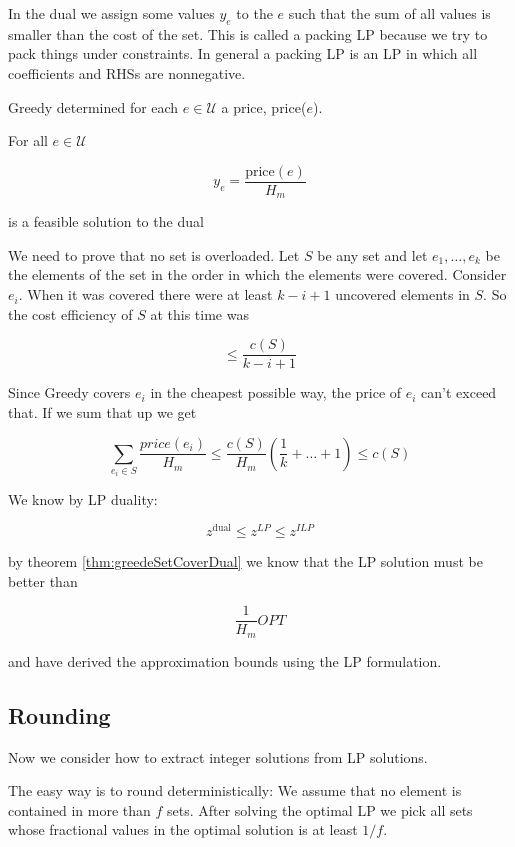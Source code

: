 In the dual we assign some values $y_e$ to the $e$ such that the sum of all values is smaller than the cost of the set. This is called a packing LP because we try to pack things under constraints. In general a packing LP is an LP in which all coefficients and RHSs are nonnegative.

\begin{thm} \label{thm:greedySetCoverDual}Greedy determined for each $e\in \mathcal{U}$ a price, price($e$).

For all $e\in \mathcal{U}$

\[y_e= \frac{\text{price}(e)}{H_m}\]

is a feasible solution to the dual
\end{thm}

\begin{pr} We need to prove that no set is overloaded. Let $S$ be any set and let $e_1,\ldots, e_k$ be the elements of the set in the order in which the elements were covered. Consider $e_i$. When it was covered there were at least $k-i+1$ uncovered elements in $S$. So the cost efficiency of $S$ at this time was 

\[\leq \frac{c(S)}{k-i+1}\]

Since Greedy covers $e_i$ in the cheapest possible way, the price of $e_i$ can't exceed that. If we sum that up we get

\[\sum_{e_i\in S} \frac{price(e_i)}{H_m} \leq \frac{c(S)}{H_m}\left(\frac{1}{k}+\ldots+1\right) \leq c(S)\]
\end{pr}

We know by LP duality:

\[z^{\text{dual}} \leq z^{LP} \leq z^{ILP}\]

by theorem \ref{thm:greedeSetCoverDual} we know that the LP solution must be better than 

\[\frac{1}{H_m} OPT\]

and have derived the approximation bounds using the LP formulation.

\subsection{Rounding}

Now we consider how to extract integer solutions from LP solutions.

The easy way is to round deterministically: We assume that no element is contained in more than $f$ sets. After solving the optimal LP we pick all sets whose fractional values in the optimal solution is at least $1/f$. 

